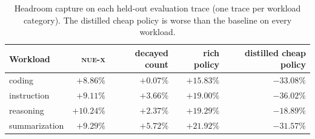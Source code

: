 \begin{table}[t]
\centering
\caption{Headroom capture on each held-out evaluation trace (one trace per workload category). The distilled cheap policy is worse than the baseline on every workload.}
\label{tab:evalwl}
\small
\begin{tabular}{lrrrr}
\toprule
Workload & \textsc{nue-x} & decayed count & rich policy & distilled cheap policy \\
\midrule
coding & $+8.86\%$ & $+0.07\%$ & $+15.83\%$ & $-33.08\%$ \\
instruction & $+9.11\%$ & $+3.66\%$ & $+19.00\%$ & $-36.02\%$ \\
reasoning & $+10.24\%$ & $+2.37\%$ & $+19.29\%$ & $-18.89\%$ \\
summarization & $+9.29\%$ & $+5.72\%$ & $+21.92\%$ & $-31.57\%$ \\
\bottomrule
\end{tabular}
\end{table}
